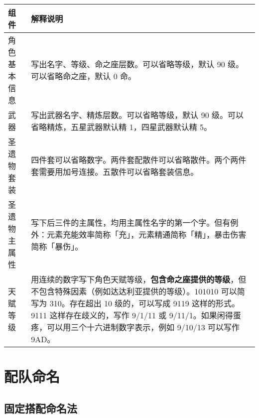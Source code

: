 \noindent\begin{tabu} {|l|X|}
	\hline
	{组件}         & {解释说明}                                                                                                                                                                                                                                                                             \\
	\hline
	{角色基本信息} & {写出名字、等级、命之座层数。可以省略等级，默认 90 级。可以省略命之座，默认 0 命。}                                                                                                                                                                                                    \\
	{武器}         & {写出武器名字、精炼层数。可以省略等级，默认 90 级。可以省略精炼，五星武器默认精 1，四星武器默认精 5。}                                                                                                                                                                                 \\
	{圣遗物套装}   & {四件套可以省略数字。两件套配散件可以省略散件。两个两件套需要用加号连接。五散件可以省略套装信息。}                                                                                                                                                                                     \\
	{圣遗物主属性} & {写下后三件的主属性，均用主属性名字的第一个字。但有例外：元素充能效率简称「充」，元素精通简称「精」，暴击伤害简称「暴伤」。}                                                                                                                                                           \\
	{天赋等级}     & {用连续的数字写下角色天赋等级，\textbf{包含命之座提供的等级}，但不包含特殊因素（例如达达利亚提供的等级）。101010 可以简写为 310。存在超出 10 级的，可以写成 9119 这样的形式。9111 这样存在歧义的，写作 9/1/11 或 9/11/1。如果闲得蛋疼，可以用三个十六进制数字表示，例如 9/10/13 可以写作 9AD。} \\
	\hline
\end{tabu}


\section{配队命名}

\subsection{固定搭配命名法}

